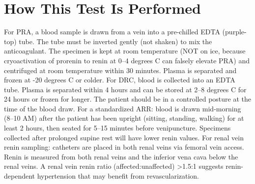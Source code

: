 \section*{How This Test Is Performed}
For PRA, a blood sample is drawn from a vein into a pre-chilled EDTA (purple-top) tube. The tube must be inverted gently (not shaken) to mix the anticoagulant. The specimen is kept at room temperature (NOT on ice, because cryoactivation of prorenin to renin at 0--4 degrees C can falsely elevate PRA) and centrifuged at room temperature within 30 minutes. Plasma is separated and frozen at -20 degrees C or colder. For DRC, blood is collected into an EDTA tube. Plasma is separated within 4 hours and can be stored at 2--8 degrees C for 24 hours or frozen for longer. The patient should be in a controlled posture at the time of the blood draw. For a standardized ARR: blood is drawn mid-morning (8--10 AM) after the patient has been upright (sitting, standing, walking) for at least 2 hours, then seated for 5--15 minutes before venipuncture. Specimens collected after prolonged supine rest will have lower renin values. For renal vein renin sampling: catheters are placed in both renal veins via femoral vein access. Renin is measured from both renal veins and the inferior vena cava below the renal veins. A renal vein renin ratio (affected:unaffected) >1.5:1 suggests renin-dependent hypertension that may benefit from revascularization.

